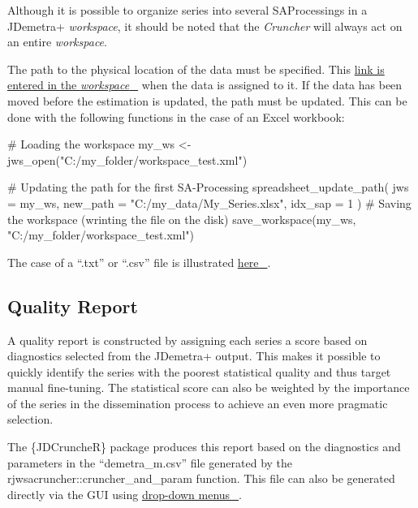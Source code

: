 \documentclass[
  letterpaper,
  DIV=11,
  numbers=noendperiod]{scrreprt}
\newenvironment{Shaded}{\begin{snugshade}}{\end{snugshade}}
\newcommand{\AttributeTok}[1]{\textcolor[rgb]{0.40,0.45,0.13}{#1}}
\newcommand{\CommentTok}[1]{\textcolor[rgb]{0.37,0.37,0.37}{#1}}
\newcommand{\DecValTok}[1]{\textcolor[rgb]{0.68,0.00,0.00}{#1}}
\newcommand{\FunctionTok}[1]{\textcolor[rgb]{0.28,0.35,0.67}{#1}}
\newcommand{\NormalTok}[1]{\textcolor[rgb]{0.00,0.23,0.31}{#1}}
\newcommand{\OtherTok}[1]{\textcolor[rgb]{0.00,0.23,0.31}{#1}}
\newcommand{\StringTok}[1]{\textcolor[rgb]{0.13,0.47,0.30}{#1}}
\begin{document}
Although it is possible to organize series into several SAProcessings in
a JDemetra+ \emph{workspace}, it should be noted that the
\emph{Cruncher} will always act on an entire \emph{workspace}.

The path to the physical location of the data must be specified. This
\protect\hyperlink{sec-concept-metadata}{link is entered in the
\emph{workspace}~🔗} when the data is assigned to it. If the data has
been moved before the estimation is updated, the path must be updated.
This can be done with the following functions in the case of an Excel
workbook:

\begin{Shaded}
\begin{Highlighting}[]
\CommentTok{\# Loading the workspace}
\NormalTok{my\_ws }\OtherTok{\textless{}{-}} \FunctionTok{jws\_open}\NormalTok{(}\StringTok{"C:/my\_folder/workspace\_test.xml"}\NormalTok{)}

\CommentTok{\# Updating the path for the first SA{-}Processing}
\FunctionTok{spreadsheet\_update\_path}\NormalTok{(}
    \AttributeTok{jws =}\NormalTok{ my\_ws,}
    \AttributeTok{new\_path =} \StringTok{"C:/my\_data/My\_Series.xlsx"}\NormalTok{,}
    \AttributeTok{idx\_sap =} \DecValTok{1}
\NormalTok{)}
\CommentTok{\# Saving the workspace (wrinting the file on the disk)}
\FunctionTok{save\_workspace}\NormalTok{(my\_ws, }\StringTok{"C:/my\_folder/workspace\_test.xml"}\NormalTok{)}
\end{Highlighting}
\end{Shaded}

The case of a ``.txt'' or ``.csv'' file is illustrated
\href{https://rjdverse.github.io/rjd3workspace/reference/txt_update_path.html}{here~🔗}.

\hypertarget{quality-report}{%
\subsection*{Quality Report}\label{quality-report}}

A quality report is constructed by assigning each series a score based
on diagnostics selected from the JDemetra+ output. This makes it
possible to quickly identify the series with the poorest statistical
quality and thus target manual fine-tuning. The statistical score can
also be weighted by the importance of the series in the dissemination
process to achieve an even more pragmatic selection.

The \{JDCruncheR\} package produces this report based on the diagnostics
and parameters in the ``demetra\_m.csv'' file generated by the
rjwsacruncher::cruncher\_and\_param function. This file can also be
generated directly via the GUI using
\href{https://doc.jdemetra.org/t-gui-output}{drop-down menus~🔗}.
\end{document}
